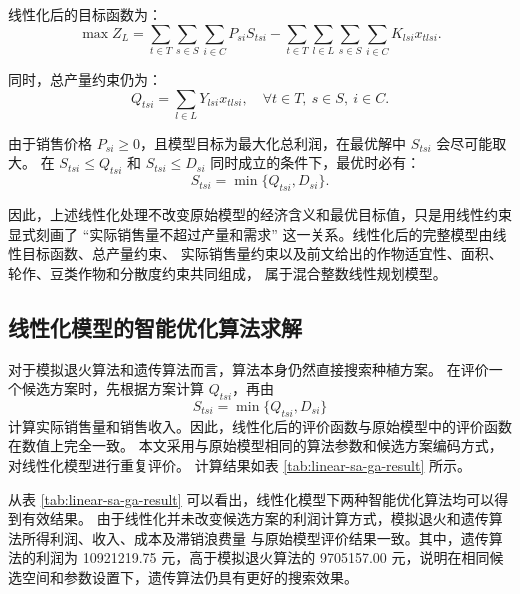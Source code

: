 \documentclass[12pt,a4paper]{ctexart}
\begin{document}
线性化后的目标函数为：
\[
\max Z_L=
\sum_{t\in T}\sum_{s\in S}\sum_{i\in C}P_{si}S_{tsi}
-
\sum_{t\in T}\sum_{l\in L}\sum_{s\in S}\sum_{i\in C}
K_{lsi}x_{tlsi}.
\]

同时，总产量约束仍为：
\[
Q_{tsi}=\sum_{l\in L}Y_{lsi}x_{tlsi},
\quad \forall t\in T,\ s\in S,\ i\in C.
\]

由于销售价格 $P_{si}\geq 0$，且模型目标为最大化总利润，在最优解中 $S_{tsi}$ 会尽可能取大。
在 $S_{tsi}\leq Q_{tsi}$ 和 $S_{tsi}\leq D_{si}$ 同时成立的条件下，最优时必有：
\[
S_{tsi}=\min\{Q_{tsi},D_{si}\}.
\]

因此，上述线性化处理不改变原始模型的经济含义和最优目标值，只是用线性约束显式刻画了
``实际销售量不超过产量和需求'' 这一关系。线性化后的完整模型由线性目标函数、总产量约束、
实际销售量约束以及前文给出的作物适宜性、面积、轮作、豆类作物和分散度约束共同组成，
属于混合整数线性规划模型。

\subsection{线性化模型的智能优化算法求解}

对于模拟退火算法和遗传算法而言，算法本身仍然直接搜索种植方案。
在评价一个候选方案时，先根据方案计算 $Q_{tsi}$，再由
\[
S_{tsi}=\min\{Q_{tsi},D_{si}\}
\]
计算实际销售量和销售收入。因此，线性化后的评价函数与原始模型中的评价函数在数值上完全一致。
本文采用与原始模型相同的算法参数和候选方案编码方式，对线性化模型进行重复评价。
计算结果如表 \ref{tab:linear-sa-ga-result} 所示。

\begin{table}[htbp]
\centering
\caption{线性化模型下两种智能优化算法的计算结果}
\label{tab:linear-sa-ga-result}
\small
\setlength{\tabcolsep}{3pt}
\end{table}

从表 \ref{tab:linear-sa-ga-result} 可以看出，线性化模型下两种智能优化算法均可以得到有效结果。
由于线性化并未改变候选方案的利润计算方式，模拟退火和遗传算法所得利润、收入、成本及滞销浪费量
与原始模型评价结果一致。其中，遗传算法的利润为 10921219.75 元，高于模拟退火算法的
9705157.00 元，说明在相同候选空间和参数设置下，遗传算法仍具有更好的搜索效果。
\end{document}

